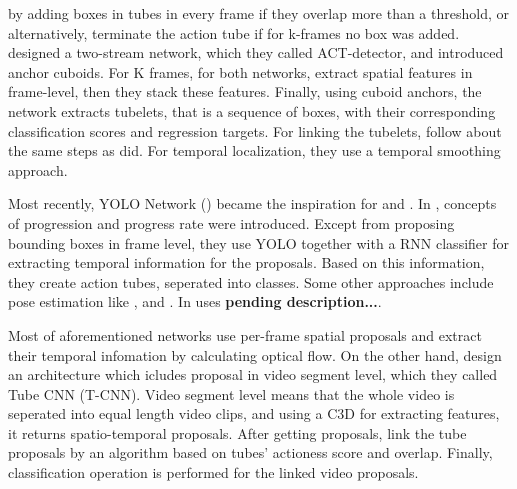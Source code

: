 by adding boxes in tubes in every frame if they overlap more than a threshold, or alternatively, terminate the action tube if for k-frames no box was added.  \cite{kalogeiton17iccv:hal-01519812}
designed a two-stream network, which they called ACT-detector, and introduced anchor cuboids. For K frames, for both networks, \cite{kalogeiton17iccv:hal-01519812} extract spatial
features in frame-level, then they stack these features. Finally, using cuboid anchors, the network extracts tubelets, that is a sequence of boxes, with their corresponding classification
scores and regression targets. For linking the tubelets, \cite{kalogeiton17iccv:hal-01519812} follow about the same steps as \cite{singh2016online} did. For temporal localization, they use
a temporal smoothing approach. \par

Most recently, YOLO Network (\cite{DBLP:journals/corr/RedmonDGF15}) became the inspiration for \cite{DBLP:journals/corr/abs-1903-00304} and
\cite{DBLP:journals/corr/abs-1802-08362}. In \cite{DBLP:journals/corr/abs-1903-00304}, concepts of progression and progress
rate were introduced. Except from proposing bounding boxes in frame level, they use YOLO together with a RNN classifier for extracting temporal information for the proposals.
Based on this information, they create action tubes, seperated into classes. Some other approaches include pose estimation like \cite{DBLP:journals/corr/abs-1802-09232}, \cite{} and
\cite{}. In \cite{DBLP:journals/corr/abs-1802-09232} uses \textbf{pending description...}. \par
Most of aforementioned networks use per-frame spatial proposals and extract their temporal infomation by calculating optical flow. On the other hand, \cite{DBLP:journals/corr/HouCS17} design
an architecture which icludes proposal in video segment level, which they called Tube CNN (T-CNN). Video segment level means that the whole video is seperated into equal length video clips, and
using a C3D for extracting features, it returns spatio-temporal proposals. After getting proposals, \cite{DBLP:journals/corr/HouCS17} link the tube proposals by an algorithm based on tubes'
actioness score and overlap. Finally, classification operation is performed for the linked video proposals.

